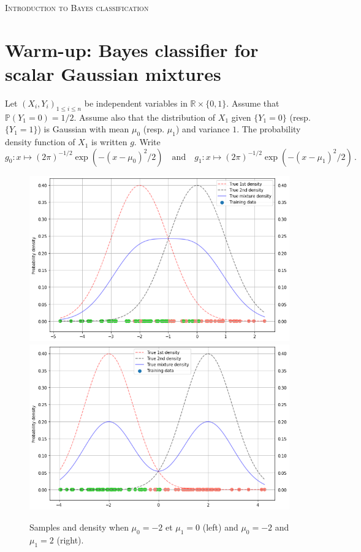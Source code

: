 \documentclass[a4paper,10pt,fleqn]{article}
\newcommand{\eqsp}{\,}
\newcommand{\1}{\ensuremath{\mathbbm{1}}}
\begin{document}

\noindent\hrulefill

\begin{center}
\textsc{Introduction to Bayes classification}
\end{center}
\hrulefill

\medskip


\section{Warm-up: Bayes classifier for scalar Gaussian mixtures}
Let $(X_i,Y_i)_{1\leqslant i\leqslant n}$ be independent variables in $\mathbb{R}\times \{0,1\}$. Assume that  $\mathbb{P}(Y_1 = 0) = 1/2$. Assume also that the distribution of $X_1$ given $\{Y_1= 0\}$ (resp. $\{Y_1= 1\}$) is Gaussian with mean $\mu_0$ (resp. $\mu_1$) and variance $1$. The probability density function of $X_1$ is written $g$. Write
$$
g_0: x \mapsto (2\pi)^{-1/2}\exp(-(x-\mu_0)^2/2)\quad\mathrm{and} \quad g_1: x \mapsto (2\pi)^{-1/2}\exp(-(x-\mu_1)^2/2)\eqsp.
$$
\begin{figure}[h!]
\begin{center}
\includegraphics[scale=0.3]{mu0_mum2.png}
\includegraphics[scale=0.3]{mu2_mum2.png}
\caption{Samples and density when   $\mu_0 = -2$ et $\mu_1 = 0$ (left) and $\mu_0 = -2$ and $\mu_1 = 2$ (right).}
\end{center}
\end{figure}
\end{document}
